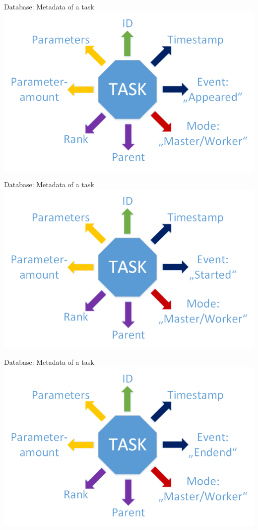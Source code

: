 	\begin{frame}{Database: Metadata of a task}
	\includegraphics[width=1.0\textwidth]{images/Task/Zeichnung1.png}
	\end{frame}
	
	\begin{frame}{Database: Metadata of a task}
	\includegraphics[width=1.0\textwidth]{images/Task/Zeichnung2.png}
	\end{frame}
	
	\begin{frame}{Database: Metadata of a task}
	\includegraphics[width=1.0\textwidth]{images/Task/Zeichnung3.png}
	\end{frame}
	
